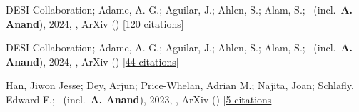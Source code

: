 \item[{\color{numcolor}\scriptsize3}] DESI Collaboration; Adame, A. G.; Aguilar, J.; Ahlen, S.; Alam, S.; \etal\ (incl.\ \textbf{A. Anand}), 2024, , ArXiv () [\href{https://ui.adsabs.harvard.edu/abs/2024arXiv241112022D}{120 citations}]

\item[{\color{numcolor}\scriptsize2}] DESI Collaboration; Adame, A. G.; Aguilar, J.; Ahlen, S.; Alam, S.; \etal\ (incl.\ \textbf{A. Anand}), 2024, , ArXiv () [\href{https://ui.adsabs.harvard.edu/abs/2024arXiv241112020D}{44 citations}]

\item[{\color{numcolor}\scriptsize1}] Han, Jiwon Jesse; Dey, Arjun; Price-Whelan, Adrian M.; Najita, Joan; Schlafly, Edward F.; \etal\ (incl.\ \textbf{A. Anand}), 2023, , ArXiv () [\href{https://ui.adsabs.harvard.edu/abs/2023arXiv230611784H}{5 citations}]